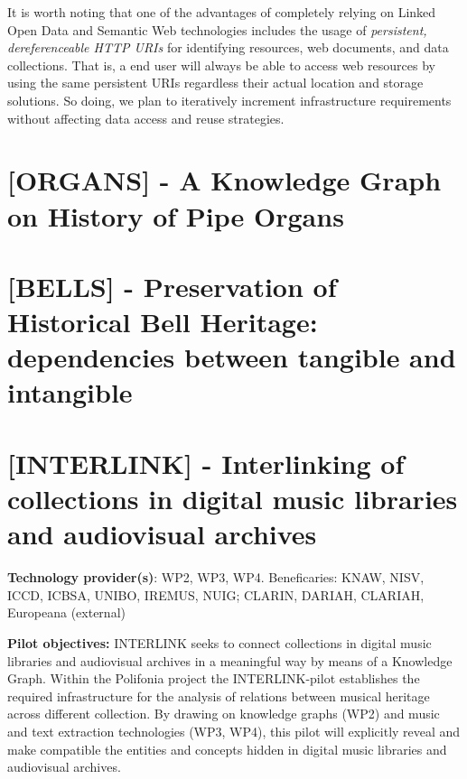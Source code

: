 It is worth noting that one of the advantages of completely relying on Linked Open Data and Semantic Web technologies includes the usage of \emph{persistent, dereferenceable HTTP URIs} for identifying resources, web documents, and data collections. That is, a end user will always be able to access web resources by using the same persistent URIs regardless their actual location and storage solutions. So doing, we plan to iteratively increment infrastructure requirements without affecting data access and reuse strategies.


\section{[ORGANS] - A Knowledge Graph on History of Pipe Organs}\label{sec:pilot:organs}

\section{[BELLS] - Preservation of Historical Bell Heritage: dependencies between tangible and intangible}\label{sec:pilot:bells}

\section{[INTERLINK] - Interlinking of collections in digital music libraries and audiovisual archives}\label{sec:pilot:interlink}

\textbf{Technology provider(s)}: WP2, WP3, WP4. 
Beneficaries: KNAW, NISV, ICCD, ICBSA, UNIBO, 
IREMUS, NUIG; CLARIN, DARIAH, CLARIAH, Europeana (external)

\textbf{Pilot objectives:} INTERLINK seeks to connect collections in digital music libraries and audiovisual archives in a meaningful way by means of a Knowledge Graph. Within the Polifonia project the INTERLINK-pilot establishes the required infrastructure for the analysis of relations between musical heritage across different collection. By drawing on knowledge graphs (WP2) and music and text extraction technologies (WP3, WP4), this pilot will explicitly reveal and make compatible the entities and concepts hidden in digital music libraries and audiovisual archives.

